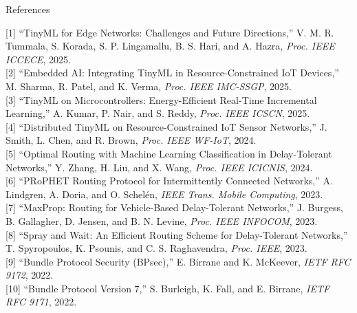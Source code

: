 \documentclass[11pt,aspectratio=43]{beamer}
\begin{document}
\begin{frame}{References}
\tiny
\setlength{\baselineskip}{8.8pt}

[1] ``TinyML for Edge Networks: Challenges and Future Directions,'' V. M. R. Tummala, S. Korada, S. P. Lingamallu, B. S. Hari, and A. Hazra, \textit{Proc. IEEE ICCECE}, 2025.\\

[2] ``Embedded AI: Integrating TinyML in Resource-Constrained IoT Devices,'' M. Sharma, R. Patel, and K. Verma, \textit{Proc. IEEE IMC-SSGP}, 2025.\\

[3] ``TinyML on Microcontrollers: Energy-Efficient Real-Time Incremental Learning,'' A. Kumar, P. Nair, and S. Reddy, \textit{Proc. IEEE ICSCN}, 2025.\\

[4] ``Distributed TinyML on Resource-Constrained IoT Sensor Networks,'' J. Smith, L. Chen, and R. Brown, \textit{Proc. IEEE WF-IoT}, 2024.\\

[5] ``Optimal Routing with Machine Learning Classification in Delay-Tolerant Networks,'' Y. Zhang, H. Liu, and X. Wang, \textit{Proc. IEEE ICICNIS}, 2024.\\

[6] ``PRoPHET Routing Protocol for Intermittently Connected Networks,'' A. Lindgren, A. Doria, and O. Schel\'en, \textit{IEEE Trans. Mobile Computing}, 2023.\\

[7] ``MaxProp: Routing for Vehicle-Based Delay-Tolerant Networks,'' J. Burgess, B. Gallagher, D. Jensen, and B. N. Levine, \textit{Proc. IEEE INFOCOM}, 2023.\\

[8] ``Spray and Wait: An Efficient Routing Scheme for Delay-Tolerant Networks,'' T. Spyropoulos, K. Psounis, and C. S. Raghavendra, \textit{Proc. IEEE}, 2023.\\

[9] ``Bundle Protocol Security (BPsec),'' E. Birrane and K. McKeever, \textit{IETF RFC 9172}, 2022.\\

[10] ``Bundle Protocol Version 7,'' S. Burleigh, K. Fall, and E. Birrane, \textit{IETF RFC 9171}, 2022.

\end{frame}
\end{document}
